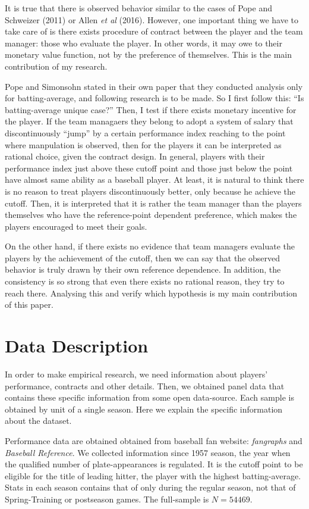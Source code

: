\documentclass[dvipdfmx, 12pt]{article}
\begin{document}
It is true that there is observed behavior similar to the cases of Pope and Schweizer (2011) or Allen \textit{et al} (2016). However, one important thing we have to take care of is there exists procedure of contract between the player and the team manager: those who evaluate the player. In other words, it may owe to their monetary value function, not by the preference of themselves. This is the main contribution of my research.

Pope and Simonsohn stated in their own paper that they conducted analysis only for batting-average, and following research is to be made. So I first follow this: ``Is batting-average unique case?'' Then, I test if there exists monetary incentive for the player. If the team managaers they belong to adopt a system of salary that discontinuously ``jump'' by a certain performance index reaching to the point where manpulation is observed, then for the players it can be interpreted as rational choice, given the contract design. In general, players with their performance index just above these cutoff point and those just below the point have almost same ability as a baseball player. At least, it is natural to think there is no reason to treat players discontinuously better, only because he achieve the cutoff. Then, it is interpreted that it is rather the team manager than the players themselves who have the reference-point dependent preference, which makes the players encouraged to meet their goals.

On the other hand, if there exists no evidence that team managers evaluate the players by the achievement of the cutoff, then we can say that the observed behavior is truly drawn by their own reference dependence. In addition, the consistency is so strong that even there exists no rational reason, they try to reach there. Analysing this and verify which hypothesis is my main contribution of this paper.

\section{Data Description}

In order to make empirical research, we need information about players' performance, contracts and other details. Then, we obtained panel data that contains these specific information from some open data-source. Each sample is obtained by unit of a single season. Here we explain the specific information about the dataset.

Performance data are obtained obtained from baseball fan website:  \textit{fangraphs} and \textit{Baseball Reference}. We collected information since 1957 season, the year when the qualified number of plate-appearances is regulated. It is the cutoff point to be eligible for the title of leading hitter, the player with the highest batting-average. Stats in each season contains that of only during the regular season, not that of Spring-Training or postseason games. The full-sample is $N=54469$.
\end{document}
